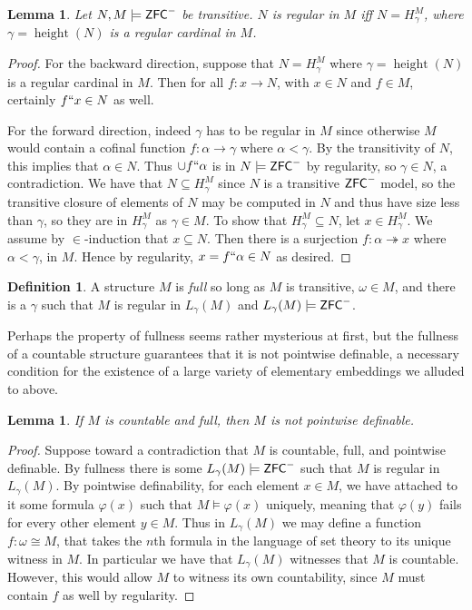\documentclass{amsart}
\newtheorem{lemma}[theorem]{Lemma}
\theoremstyle{definition}
\newtheorem{definition}[theorem]{Definition}
\theoremstyle{remark}
\newcommand{\ZFC}{\textup{\ensuremath{\textsf{ZFC}}}}
\DeclareMathOperator{\height}{height}
\begin{document}
\begin{lemma} \label{lemma:regularityequiv}
Let $N, M \models \ZFC^-$ be transitive. $N$ is regular in $M$ iff $N = H_\gamma^M$, where $\gamma = \height(N)$ is a regular cardinal in $M$. %
\end{lemma}
\begin{proof}
For the backward direction, suppose that $N=H_\gamma^M$ where $\gamma = \height(N)$ is a regular cardinal in $M$. Then for all $f: x \longrightarrow N$, with $x \in N$ and $f \in M$, certainly $f``x \in N$ as well.

For the forward direction, indeed $\gamma$ has to be regular in $M$ since otherwise $M$ would contain a cofinal function $f: \alpha \longrightarrow \gamma$ where $\alpha < \gamma$. By the transitivity of $N$, this implies that $\alpha \in N$. Thus $\cup f``\alpha$ is in $N \models \ZFC^-$ by regularity, so $\gamma \in N$, a contradiction.
We have that $N \subseteq H_{\gamma}^M$ since $N$ is a transitive $\ZFC^-$ model, so the transitive closure of elements of $N$ may be computed in $N$ and thus have size less than $\gamma$, so they are in $H_\gamma^M$ as $\gamma \in M$. To show that $H_{\gamma}^M \subseteq N$, let $x \in H_{\gamma}^M$. We assume by $\in$-induction that $x \subseteq N$. Then there is a surjection $f: \alpha \twoheadrightarrow x$ where $\alpha < \gamma$, in $M$. Hence by regularity, $x = f``\alpha \in N$ as desired.
\end{proof}

\begin{definition} A structure $M$ is \emph{full} so long as $M$ is transitive, $\omega \in M$, and there is a $\gamma$ such that $M$ is regular in $L_\gamma(M)$ and $L_\gamma(M) \models \ZFC^-$.
\end{definition}

Perhaps the property of fullness seems rather mysterious at first, but the fullness of a countable structure guarantees that it is not pointwise definable, a necessary condition for the existence
of a large variety of elementary embeddings we alluded to above.

\begin{lemma} If $M$ is countable and full, then $M$ is not pointwise definable. \end{lemma}
\begin{proof} Suppose toward a contradiction that $M$ is countable, full, and pointwise definable. By fullness there is some $L_\gamma(M) \models \ZFC^-$ such that $M$ is regular in $L_\gamma(M)$. By pointwise definability, for each element $x \in M$, we have attached to it some formula $\varphi(x)$ such that $M \models \varphi(x)$ uniquely, meaning that $\varphi(y)$ fails for every other element $y \in M$. Thus in $L_\gamma(M)$ we may define a function $f: \omega \cong M$, that takes the $n$th formula in the language of set theory to its unique witness in $M$. In particular we have that $L_\gamma(M)$ witnesses that $M$ is countable. However, this would allow $M$ to witness its own countability, since $M$ must contain $f$ as well by regularity. \end{proof} 
\end{document}
